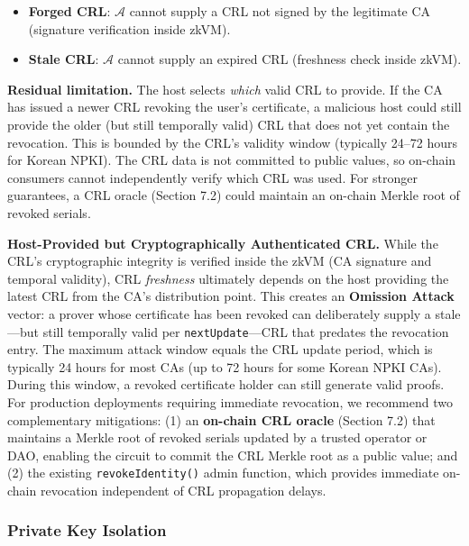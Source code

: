 \documentclass[11pt, a4paper]{article}
\providecommand{\tightlist}{%
  \setlength{\itemsep}{0pt}\setlength{\parskip}{0pt}}
\begin{document}
\begin{itemize}
\tightlist
\item
  \textbf{Forged CRL}: \(\mathcal{A}\) cannot supply a CRL not signed by
  the legitimate CA (signature verification inside zkVM).
\item
  \textbf{Stale CRL}: \(\mathcal{A}\) cannot supply an expired CRL
  (freshness check inside zkVM).
\end{itemize}

\textbf{Residual limitation.} The host selects \emph{which} valid CRL to
provide. If the CA has issued a newer CRL revoking the user's
certificate, a malicious host could still provide the older (but still
temporally valid) CRL that does not yet contain the revocation. This is
bounded by the CRL's validity window (typically 24--72 hours for Korean
NPKI). The CRL data is not committed to public values, so on-chain
consumers cannot independently verify which CRL was used. For stronger
guarantees, a CRL oracle (Section 7.2) could maintain an on-chain Merkle
root of revoked serials.

\textbf{Host-Provided but Cryptographically Authenticated CRL.} While
the CRL's cryptographic integrity is verified inside the zkVM (CA
signature and temporal validity), CRL \emph{freshness} ultimately
depends on the host providing the latest CRL from the CA's distribution
point. This creates an \textbf{Omission Attack} vector: a prover whose
certificate has been revoked can deliberately supply a stale---but still
temporally valid per \texttt{nextUpdate}---CRL that predates the
revocation entry. The maximum attack window equals the CRL update
period, which is typically 24 hours for most CAs (up to 72 hours for
some Korean NPKI CAs). During this window, a revoked certificate holder
can still generate valid proofs. For production deployments requiring
immediate revocation, we recommend two complementary mitigations: (1) an
\textbf{on-chain CRL oracle} (Section 7.2) that maintains a Merkle root
of revoked serials updated by a trusted operator or DAO, enabling the
circuit to commit the CRL Merkle root as a public value; and (2) the
existing \texttt{revokeIdentity()} admin function, which provides
immediate on-chain revocation independent of CRL propagation delays.

\subsubsection{Private Key Isolation}\label{private-key-isolation-1}
\end{document}
